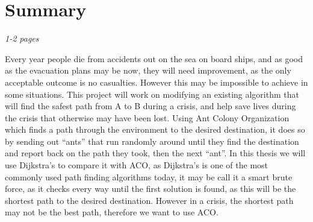 \chapter{Summary}
\label{ch:summary}
\textit{1-2 pages}


Every year people die from accidents out on the sea on board ships, and as good as the evacuation plans may be now, they will need improvement, as the only acceptable outcome is no casualties. However this may be impossible to achieve in some situations. This project will work on modifying an existing algorithm that will find the safest path from A to B during a crisis, and help save lives during the crisis that otherwise may have been lost. Using Ant Colony Organization which finds a path through the environment to the desired destination, it does so by sending out “ants” that run randomly around until they find the destination and report back on the path they took, then the next “ant”.  In this thesis we will use Dijkstra's to compare it with ACO, as Dijkstra's is one of the most commonly used path finding algorithms today, it may be call it a smart brute force, as it checks every way until the first solution is found, as this will be the shortest path to the desired destination. However in a crisis, the shortest path may not be the best path, therefore we want to use ACO.
